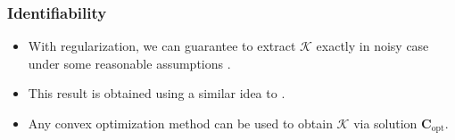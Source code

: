 \documentclass[10pt,xcolor={usenames,dvipsnames,table}]{beamer}
\def\blue{\color{blue}}
\newcommand{\norm}[1]{\left\lVert#1\right\rVert}
\newcommand{\citep}[1]{{\blue \scriptsize \parencite{#1}}}
\begin{document}
\begin{frame}[label=fine]
    \frametitle{Identifiability}

    \begin{itemize}
        \item With regularization, we can guarantee to extract $\mathcal{K}$ exactly in noisy case under some reasonable assumptions \citep{nguyen2021memory}. 
        \item This result is obtained using a similar idea to \citep{fu2015robust}.
        \item Any convex optimization method can be used to obtain $\mathcal{K}$ via solution $\bm{C}_{\text{opt}}$.
    \end{itemize}


\end{frame}
\end{document}
